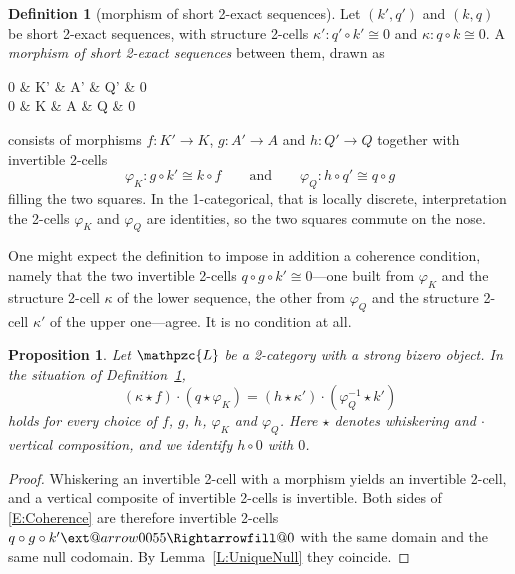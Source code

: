 \documentclass[reqno,a4paper]{amsart}
\makeatletter
\numberwithin{equation}{section}
\theoremstyle{plain}
\newtheorem{proposition}[subsection]{Proposition}
\theoremstyle{definition}
\newtheorem{definition}[subsection]{Definition}
\def\nameit#1{\textrm{#1}~}
\def\lemx{\nameit{Lemma}}
\def\defx{\nameit{Definition}}
\def\dfn#1{{\itshape #1}}
\newcommand{\comp}{\circ}
\newcommand{\iso}{\cong}
\def\phi{\varphi}
\newcommand{\catfont}[1]{\ensuremath{\mathpzc{#1}}\xspace}
\def\L{\catfont{L}}
\renewcommand{\1}{\onecat{1}}
\newcommand{\aR}[2][]{%
	\ext@arrow 0055{\Rightarrowfill@}{#1}{#2}}
\makeatother
\begin{document}
\begin{definition}[morphism of short 2-exact sequences]\label{Def:morphism of SES}
	Let \((k',q')\) and \((k,q)\) be short 2-exact sequences, with structure 2-cells \(\kappa'\colon q'\comp k'\iso 0\) and \(\kappa\colon q\comp k\iso 0\). A \dfn{morphism of short 2-exact sequences} between them, drawn as
	\begin{cd}[5][5]
		0 \& {K'} \& {A'} \& {Q'} \& 0 \\
		0 \& K \& A \& Q \& 0
		\arrow[from=1-1, to=1-2]
		\arrow["{k'}", from=1-2, to=1-3]
		\arrow[""{name=0, anchor=center, inner sep=0}, "{f}"', from=1-2, to=2-2]
		\arrow["{q'}", from=1-3, to=1-4]
		\arrow[""{name=1, anchor=center, inner sep=0}, "{g}", from=1-3, to=2-3]
		\arrow[from=1-4, to=1-5]
		\arrow[""{name=2, anchor=center, inner sep=0}, "{h}", from=1-4, to=2-4]
		\arrow[from=2-1, to=2-2]
		\arrow["k"', from=2-2, to=2-3]
		\arrow["q"', from=2-3, to=2-4]
		\arrow[from=2-4, to=2-5]
		\arrow["\phi_K"{inner sep=1.1ex},shift right=1, iso, from=0, to=1]
		\arrow["\phi_Q"{inner sep=1.1ex},shift right=1, iso, from=1, to=2]
	\end{cd}
	consists of morphisms \(f\colon K'\to K\), \(g\colon A'\to A\) and \(h\colon Q'\to Q\) together with invertible 2-cells
	\[
		\phi_K\colon g\comp k'\iso k\comp f
		\qquad\text{and}\qquad
		\phi_Q\colon h\comp q'\iso q\comp g
	\]
	filling the two squares. In the 1-categorical, that is locally discrete, interpretation the 2-cells \(\phi_K\) and \(\phi_Q\) are identities, so the two squares commute on the nose.
\end{definition}

One might expect the definition to impose in addition a coherence condition, namely that the two invertible 2-cells \(q\comp g\comp k'\iso 0\)---one built from \(\phi_K\) and the structure 2-cell \(\kappa\) of the lower sequence, the other from \(\phi_Q\) and the structure 2-cell \(\kappa'\) of the upper one---agree. It is no condition at all.

\begin{proposition}\label{P:CoherenceFree}
	Let \(\L\) be a 2-category with a strong bizero object. In the situation of \defx\ref{Def:morphism of SES},
	\begin{equation}\label{E:Coherence}
		(\kappa\star f)\cdot(q\star\phi_K)=(h\star\kappa')\cdot(\phi_Q^{-1}\star k')
	\end{equation}
	holds for every choice of \(f\), \(g\), \(h\), \(\phi_K\) and \(\phi_Q\). Here \(\star\) denotes whiskering and \(\cdot\) vertical composition, and we identify \(h\comp 0\) with \(0\).
\end{proposition}
\begin{proof}
	Whiskering an invertible 2-cell with a morphism yields an invertible 2-cell, and a vertical composite of invertible 2-cells is invertible. Both sides of \eqref{E:Coherence} are therefore invertible 2-cells \(q\comp g\comp k'\aR{}0\) with the same domain and the same null codomain. By \lemx\ref{L:UniqueNull} they coincide.
\end{proof}
\end{document}
